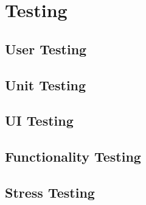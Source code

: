 \chapter{Testing}

\section{User Testing}

\section{Unit Testing}

\section{UI Testing}

\section{Functionality Testing}

\section{Stress Testing}

